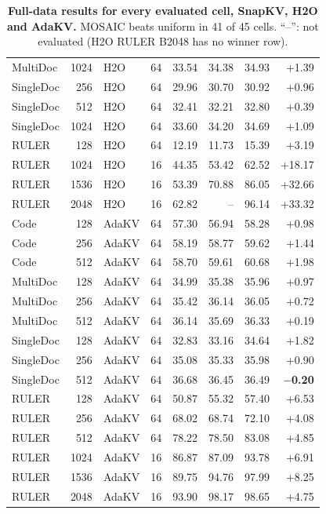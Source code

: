 \begin{table}[!b]
\begin{tabular}{@{}l r l r r r r r@{}}
    MultiDoc & 1024 & H2O & 64 & 33.54 & 34.38 & 34.93 & +1.39 \\
    SingleDoc & 256 & H2O & 64 & 29.96 & 30.70 & 30.92 & +0.96 \\
    SingleDoc & 512 & H2O & 64 & 32.41 & 32.21 & 32.80 & +0.39 \\
    SingleDoc & 1024 & H2O & 64 & 33.60 & 34.20 & 34.69 & +1.09 \\
    RULER & 128 & H2O & 64 & 12.19 & 11.73 & 15.39 & +3.19 \\
    RULER & 1024 & H2O & 16 & 44.35 & 53.42 & 62.52 & +18.17 \\
    RULER & 1536 & H2O & 16 & 53.39 & 70.88 & 86.05 & +32.66 \\
    RULER & 2048 & H2O & 16 & 62.82 & -- & 96.14 & +33.32 \\
    Code & 128 & AdaKV & 64 & 57.30 & 56.94 & 58.28 & +0.98 \\
    Code & 256 & AdaKV & 64 & 58.19 & 58.77 & 59.62 & +1.44 \\
    Code & 512 & AdaKV & 64 & 58.70 & 59.61 & 60.68 & +1.98 \\
    MultiDoc & 128 & AdaKV & 64 & 34.99 & 35.38 & 35.96 & +0.97 \\
    MultiDoc & 256 & AdaKV & 64 & 35.42 & 36.14 & 36.05 & +0.72 \\
    MultiDoc & 512 & AdaKV & 64 & 36.14 & 35.69 & 36.33 & +0.19 \\
    SingleDoc & 128 & AdaKV & 64 & 32.83 & 33.16 & 34.64 & +1.82 \\
    SingleDoc & 256 & AdaKV & 64 & 35.08 & 35.33 & 35.98 & +0.90 \\
    SingleDoc & 512 & AdaKV & 64 & 36.68 & 36.45 & 36.49 & \textbf{$-$0.20} \\
    RULER & 128 & AdaKV & 64 & 50.87 & 55.32 & 57.40 & +6.53 \\
    RULER & 256 & AdaKV & 64 & 68.02 & 68.74 & 72.10 & +4.08 \\
    RULER & 512 & AdaKV & 64 & 78.22 & 78.50 & 83.08 & +4.85 \\
    RULER & 1024 & AdaKV & 16 & 86.87 & 87.09 & 93.78 & +6.91 \\
    RULER & 1536 & AdaKV & 16 & 89.75 & 94.76 & 97.99 & +8.25 \\
    RULER & 2048 & AdaKV & 16 & 93.90 & 98.17 & 98.65 & +4.75 \\
    \bottomrule
  \end{tabular}
  \caption{\textbf{Full-data results for every evaluated cell, SnapKV, H2O and AdaKV.} MOSAIC beats uniform in 41 of 45 cells. ``--'': not evaluated (H2O RULER B2048 has no winner row).}
  \label{tab:app-cells}
\end{table}

